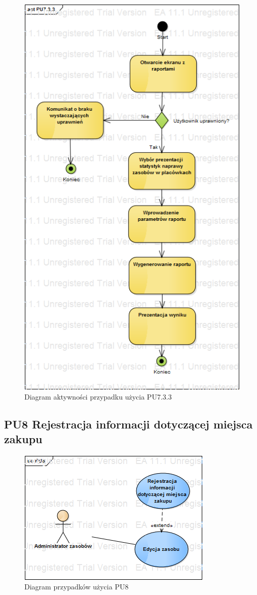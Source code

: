\begin{figure}[h!]
	\centering
	\includegraphics[scale=0.6]{img/diagrams/activityDiagrams/PU733}
	\caption{Diagram aktywności przypadku użycia PU7.3.3 \label{fig:labelADPU7.3.3}}
\end{figure}

\subsection{PU8 Rejestracja informacji dotyczącej miejsca zakupu} \label{pu8}
\begin{figure}[h!]
	\centering
	\includegraphics[scale=0.6]{img/diagrams/useCaseDiagrams/PU8}
	\caption{Diagram przypadków użycia PU8 \label{fig:labelUCPU8}}
\end{figure}

